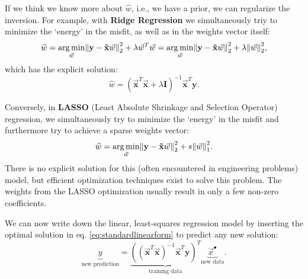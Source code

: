\documentclass{article}
\DeclarePairedDelimiter\norm{\lVert}{\rVert}%
\DeclareMathOperator*{\argmin}{arg\,min}
\begin{document}
\begin{spexample}
    If we think we know more about $\widehat{w}$, i.e., we have a prior, we can regularize the inversion. For example, with \textbf{Ridge Regression} we simultaneously triy to minimize the `energy' in the misfit, as well as in the weights vector itself:
    \begin{equation}
        \widehat{w} = \argmin_{\vec{w}} \norm*{\mathbf{y}-\mathbf{\vec{x}}\vec{w}}_2^2 + \lambda\vec{w}^T\vec{w} = \argmin_{\vec{w}} \norm*{\mathbf{y}-\mathbf{\vec{x}}\vec{w}}_2^2 + \lambda\norm*{\vec{w}}_2^2,
    \end{equation}
    which has the explicit solution:
    \begin{equation}
        \widehat{w} = (\mathbf{\vec{x}}^T\mathbf{\vec{x}}+\lambda\mathbf{I})^{-1}\mathbf{\vec{x}}^T\mathbf{y}.
    \end{equation}
    
    Conversely, in \textbf{LASSO} (Least Absolute Shrinkage and Selection Operator) regression, we simultaneously try to minimize the `energy' in the misfit and furthermore try to achieve a sparse weights vector:
    \begin{equation}
        \widehat{w} = \argmin_{\vec{w}} \norm*{\mathbf{y}-\mathbf{\vec{x}}\vec{w}}_2^2 + s\norm*{\vec{w}}_1^2.
    \end{equation}
    There is no explicit solution for this (often encountered in engineering problems) model, but efficient optimization techniques exist to solve this problem. The weights from the LASSO optimization usually result in only a few non-zero coefficients.
\end{spexample}
We can now write down the linear, least-squares regression model by inserting the optimal solution in eq. \eqref{eq:standardlinearform} to predict any new solution:
\begin{equation}
    \underbrace{y}_\text{new prediction} = \underbrace{\left((\mathbf{\vec{x}}^{T}\mathbf{\vec{x}})^{-1} \mathbf{\vec{x}}^{T}\mathbf{y}\right)^T}_\text{training data}\underbrace{\vec{x}^\bullet}_\text{new data}.
\end{equation}
\end{document}
